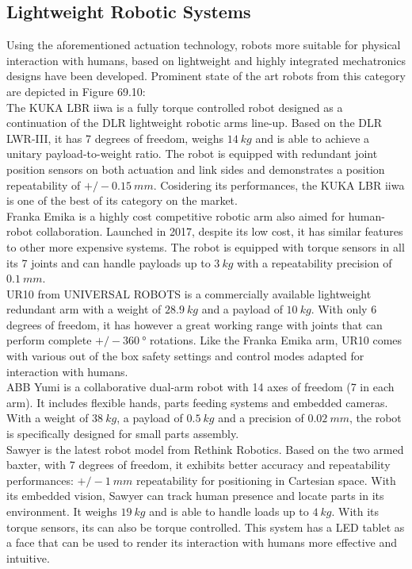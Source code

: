 \subsection{Lightweight Robotic Systems}  
Using the aforementioned actuation technology, robots more suitable for
physical interaction with humans, based on lightweight and highly integrated mechatronics designs have been developed. Prominent state of the art robots from this category are depicted in Figure 69.10: \\
The KUKA LBR iiwa is a fully torque controlled robot designed as a continuation of the DLR lightweight robotic arms line-up. Based on the DLR LWR-III, it has 7 degrees of freedom, weighs $14~kg$ and is able to achieve a unitary payload-to-weight ratio. The robot is equipped with redundant joint position sensors on both actuation and link sides and demonstrates a position repeatability of $+/-0.15~mm$. Cosidering its performances, the KUKA LBR iiwa is one of the best of its category on the market. \\
%
Franka Emika is a highly cost competitive robotic arm also aimed for human-robot collaboration. Launched in 2017, despite its low cost, it has similar features to other more expensive systems. The robot is equipped with torque sensors in all its 7 joints and can handle payloads up to $3~kg$ with a repeatability precision of $0.1~mm$. \\
%
UR10 from UNIVERSAL ROBOTS is a commercially available lightweight redundant arm with a weight of $28.9~kg$ and a payload of $10~kg$. With only 6 degrees of freedom, it has however a great working range with joints that can perform  complete $+/-360~°$ rotations. Like the Franka Emika arm, UR10 comes with various out of the box safety settings and control modes adapted for interaction with humans. \\
%
ABB Yumi is a collaborative dual-arm robot with 14 axes of freedom (7 in each arm). It includes flexible hands, parts feeding systems and embedded cameras. With a weight of $38~kg$, a payload of $0.5~kg$ and a precision of $0.02~mm$, the robot is specifically designed for small parts assembly. \\
%
Sawyer is the latest robot model from Rethink Robotics. Based on the two armed baxter, with 7 degrees of freedom, it exhibits better accuracy and repeatability performances: $+/-1~mm$ repeatability for positioning in Cartesian space. With its embedded vision, Sawyer can track human presence and locate parts in its environment. It weighs $19~kg$ and is able to handle loads up to $4~kg$. With its torque sensors, its can also be torque controlled. This system has a LED tablet as a face that can be used to render its interaction with humans more effective and intuitive.

